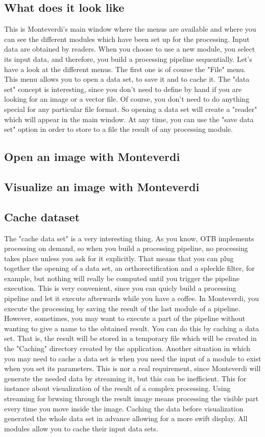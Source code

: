\documentclass{InsightSoftwareGuide}
\begin{document}
\subsection{What does it look like}
This is Monteverdi's main window where the menus are available and where you can see the different modules which have been set up for the processing. Input data are obtained by readers. When you choose to use a new module, you select its input data, and therefore, you build a processing pipeline sequentially. Let's have a look at the different menus. The first one is of course the "File" menu. This menu allows you to open a data set, to save it and to cache it. The "data set" concept is interesting, since you don't need to define by hand if you are looking for an image or a vector file. Of course, you don't need to do anything special for any particular file format. So opening a data set will create a "reader" which will appear in the main window. At any time, you can use the "save data set" option in order to store to a file the result of any processing module.
\subsection{Open an image with Monteverdi}
\subsection{Visualize an image with Monteverdi}
\subsection{Cache dataset}
The "cache data set" is a very interesting thing. As you know, OTB implements processing on demand, so when you build a processing pipeline, no processing takes place unless you ask for it explicitly. That means that you can plug together the opening of a data set, an orthorectification and a spleckle filter, for example, but nothing will really be computed until you trigger the pipeline execution. This is very convenient, since you can quicly build a processing pipeline and let it execute afterwards while you have a coffee. In Monteverdi, you execute the processing by saving the result of the last module of a pipeline. However, sometimes, you may want to execute a part of the pipeline without wanting to give a name to the obtained result. You can do this by caching a data set. That is, the result will be stored in a temporary file which will be created in the "Caching" directory created by the application. Another situation in which you may need to cache a data set is when you need the input of a module to exist when you set its parameters. This is nor a real requirement, since Monteverdi will generate the needed data by streaming it, but this can be inefficient. This for instance about visualization of the result of a complex processing. Using streaming for brwsing through the result image means processing the visible part every time you move inside the image. Caching the data before visualization generated the whole data set in advance allowing for a more swift display. All modules allow you to cache their input data sets.
\end{document}
